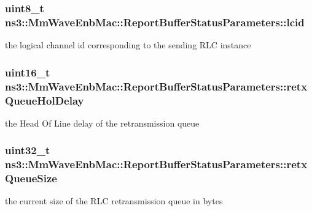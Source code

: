 \subsubsection[{\texorpdfstring{lcid}{lcid}}]{\setlength{\rightskip}{0pt plus 5cm}uint8\+\_\+t ns3\+::\+Mm\+Wave\+Enb\+Mac\+::\+Report\+Buffer\+Status\+Parameters\+::lcid}\hypertarget{structns3_1_1MmWaveEnbMac_1_1ReportBufferStatusParameters_a52668c7e5fb3cf84cd562b24f1ea0c7f}{}\label{structns3_1_1MmWaveEnbMac_1_1ReportBufferStatusParameters_a52668c7e5fb3cf84cd562b24f1ea0c7f}
the logical channel id corresponding to the sending R\+LC instance 
\subsubsection[{\texorpdfstring{retx\+Queue\+Hol\+Delay}{retxQueueHolDelay}}]{\setlength{\rightskip}{0pt plus 5cm}uint16\+\_\+t ns3\+::\+Mm\+Wave\+Enb\+Mac\+::\+Report\+Buffer\+Status\+Parameters\+::retx\+Queue\+Hol\+Delay}\hypertarget{structns3_1_1MmWaveEnbMac_1_1ReportBufferStatusParameters_a6cbd87b1fd07373cd641ee733a5e0483}{}\label{structns3_1_1MmWaveEnbMac_1_1ReportBufferStatusParameters_a6cbd87b1fd07373cd641ee733a5e0483}
the Head Of Line delay of the retransmission queue 
\subsubsection[{\texorpdfstring{retx\+Queue\+Size}{retxQueueSize}}]{\setlength{\rightskip}{0pt plus 5cm}uint32\+\_\+t ns3\+::\+Mm\+Wave\+Enb\+Mac\+::\+Report\+Buffer\+Status\+Parameters\+::retx\+Queue\+Size}\hypertarget{structns3_1_1MmWaveEnbMac_1_1ReportBufferStatusParameters_a7f1ceb103dfcb1b4178eee11109e4605}{}\label{structns3_1_1MmWaveEnbMac_1_1ReportBufferStatusParameters_a7f1ceb103dfcb1b4178eee11109e4605}
the current size of the R\+LC retransmission queue in bytes 
